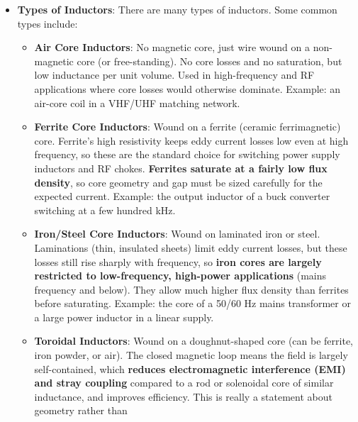 \begin{itemize}
    Eddy currents are circulating currents induced in the core of an
    inductor by the changing magnetic field. These currents flow in
    closed loops within the core material and can cause significant
    power losses due to the resistive heating of the core. To minimize
    eddy current losses, cores are often laminated or made from
    materials with high electrical resistance, such as ferrites.
  \item \textbf{Types of Inductors}:
    There are many types of inductors. Some common types include:
    \begin{itemize}
      \item \textbf{Air Core Inductors}: No magnetic core, just wire wound
        on a non-magnetic core (or free-standing). No core losses and no
        saturation, but low inductance per unit volume. Used in high-frequency
        and RF applications where core losses would otherwise dominate.
        Example: an air-core coil in a VHF/UHF matching network.
      \item \textbf{Ferrite Core Inductors}: Wound on a ferrite (ceramic
        ferrimagnetic) core. Ferrite's high resistivity keeps eddy current
        losses low even at high frequency, so these are the standard choice
        for switching power supply inductors and RF chokes. \textbf{Ferrites
        saturate at a fairly low flux density}, so core geometry and gap
        must be sized carefully for the expected current.
        Example: the output inductor of a buck converter switching at a few
        hundred kHz.
      \item \textbf{Iron/Steel Core Inductors}: Wound on laminated iron or
        steel. Laminations (thin, insulated sheets) limit eddy current
        losses, but these losses still rise sharply with frequency, so
        \textbf{iron cores are largely restricted to low-frequency, high-power
        applications} (mains frequency and below). They allow much higher
        flux density than ferrites before saturating.
        Example: the core of a 50/60 Hz mains transformer or a large power
        inductor in a linear supply.
      \item \textbf{Toroidal Inductors}: Wound on a doughnut-shaped core
        (can be ferrite, iron powder, or air). The closed magnetic loop
        means the field is largely self-contained, which \textbf{reduces
        electromagnetic interference (EMI) and stray coupling} compared to
        a rod or solenoidal core of similar inductance, and improves
        efficiency. This is really a statement about geometry rather than

\end{itemize}
\end{itemize}
